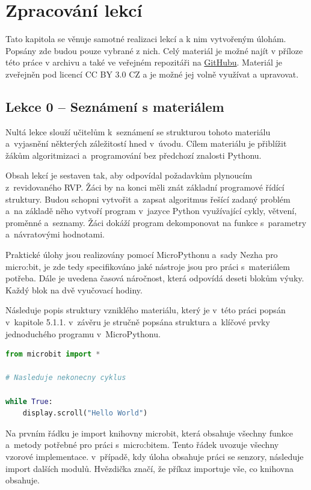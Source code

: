 \documentclass[
  digital,     %
  oneside,     %
  nosansbold,  %
  colorbold, %
  lof,         %
  nolot,         %
]{fithesis4}
\begin{document}
\section{Zpracování lekcí}

Tato kapitola se věnuje samotné realizaci lekcí a k nim vytvořeným úlohám. Popsány zde budou pouze vybrané z nich. %
Celý materiál je možné najít v příloze této práce v archivu %
a také ve veřejném repozitáři na \href{https://github.com/denisa-mat/BP-microbit}{GitHubu}. Materiál je zveřejněn pod licencí CC BY 3.0 CZ a je možné jej volně využívat a upravovat.

\subsection{Lekce 0 -- Seznámení s materiálem}
Nultá lekce slouží učitelům k~seznámení se strukturou tohoto materiálu a~vyjasnění některých záležitostí hned v~úvodu. Cílem materiálu je přiblížit žákům algoritmizaci a~programování bez předchozí znalosti Pythonu. 

Obsah lekcí je sestaven tak, aby odpovídal požadavkům plynoucím z~revidovaného RVP. Žáci by na konci měli znát základní programové řídící struktury. Budou schopni vytvořit a~zapsat algoritmus řešící zadaný problém a~na základě něho vytvoří program v~jazyce Python využívající cykly, větvení, proměnné a~seznamy. Žáci dokáží program dekomponovat na funkce s~parametry a~návratovými hodnotami.

Praktické úlohy jsou realizovány pomocí MicroPythonu a~sady Nezha pro micro:bit, je zde tedy specifikováno jaké nástroje jsou pro práci s~materiálem potřeba. Dále je uvedena časová náročnost, která odpovídá deseti blokům výuky. Každý blok na dvě vyučovací hodiny.

Následuje popis struktury vzniklého materiálu, který je v~této práci popsán v~kapitole 5.1.1. v~závěru je stručně popsána struktura a~klíčové prvky jednoduchého programu v~MicroPythonu. 
\begin{footnotesize}
\begin{lstlisting}[language=Python, caption=struktura programu v~MicroPythonu]
from microbit import *

# Nasleduje nekonecny cyklus

while True:
    display.scroll("Hello World")
\end{lstlisting}
\end{footnotesize}

Na prvním řádku je import knihovny microbit, která obsahuje všechny funkce a~metody potřebné pro práci s~micro:bitem. Tento řádek uvozuje všechny vzorové implementace. v~případě, kdy úloha obsahuje práci se senzory, následuje import dalších modulů. Hvězdička značí, že příkaz importuje vše, co knihovna obsahuje.
\end{document}
